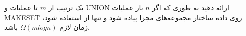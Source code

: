 یک ترتیب از $m$ تا عملیات  و UNION ارائه دهید به طوری که اگر $n$ بار عملیات MAKESET روی داده ساختار مجموعه‌های مجزا پیاده شود و تنها از  استفاده شود، زمان لازم $\Omega (mlogn)$ باشد.